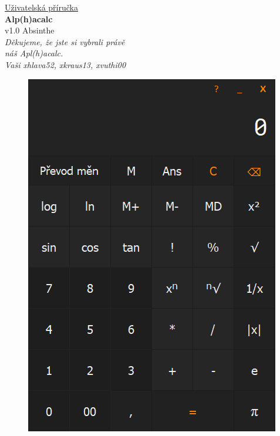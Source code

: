 \documentclass[a4paper, 12pt]{article}
\begin{document}
\thispagestyle{empty}
\begin{minipage}[b]{0.5\textwidth}
{\fontsize{18pt}{10pt}\selectfont\underline{Uživatelská příručka}}\\[4mm]
{\fontsize{150pt}{150pt}\selectfont\textbf{Alp(h)acalc}}\\[2mm]
{\fontsize{10pt}{10pt}v1.0 Absinthe}\\
\newline
\newline
\newline
\newline
\newline
\newline
\newline
\newline
\newline
\newline
{\fontsize{12pt}{10pt}\selectfont\textit{Děkujeme, že jste si vybrali právě\\ náš Apl(h)acalc.}}\\
\phantom{xxxxxxxx} {\fontsize{12pt}{10pt}\selectfont\textit{Vaši xhlava52, xkraus13, xvuthi00}}\\
\end{minipage}%
\begin{minipage}[b]{0.07\textwidth}
\begin{figure}[H]
\includegraphics[scale=0.6]{kalkulacka.png}
\end{figure}
\end{minipage}
\newline
\end{document}
